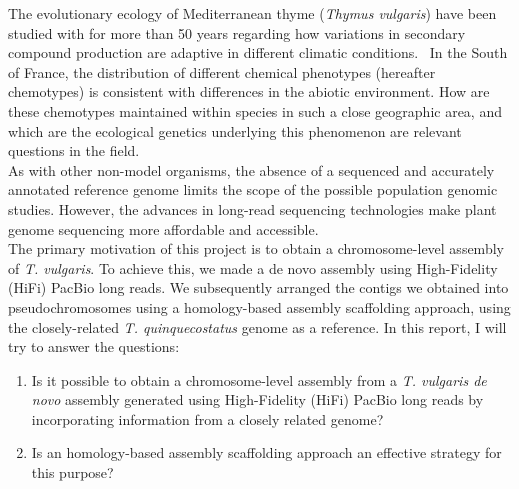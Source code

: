 The evolutionary ecology of Mediterranean thyme (\textit{Thymus vulgaris}) have been studied with for more than 50 years regarding how variations in secondary compound production are adaptive in different climatic conditions.~\cite{thompsonBibliography2020} In the South of France, the distribution of different chemical phenotypes (hereafter chemotypes) is consistent with differences in the abiotic environment. How are these chemotypes maintained within species in such a close geographic area, and which are the ecological genetics underlying this phenomenon are relevant questions in the field.~\cite{bataillonGenotypePhenotypeGenetic2022}\\

As with other non-model organisms, the absence of a sequenced and accurately annotated reference genome limits the scope of the possible population genomic studies. However, the advances in long-read sequencing technologies make plant genome sequencing more affordable and accessible.~\cite{puckerPlantGenomeSequence2022} \\

The primary motivation of this project is to obtain a chromosome-level assembly of \textit{T. vulgaris}. To achieve this, we made a de novo assembly using High-Fidelity (HiFi) PacBio long reads. We subsequently arranged the contigs we obtained into pseudochromosomes using a homology-based assembly scaffolding approach, using the closely-related \textit{T. quinquecostatus} genome as a reference. In this report, I will try to answer the questions:

\begin{enumerate}
    \item Is it possible to obtain a chromosome-level assembly from a  \textit{T. vulgaris de novo} assembly generated using High-Fidelity (HiFi) PacBio long reads by incorporating information from a closely related genome?
    \item Is an homology-based assembly scaffolding approach an effective strategy for this purpose?
\end{enumerate}

